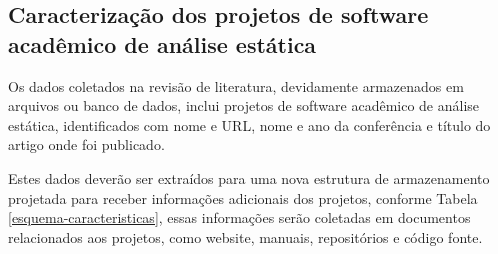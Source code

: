 

\subsection{Caracterização dos projetos de software acadêmico de análise estática}

Os dados coletados na revisão de literatura, devidamente armazenados em
arquivos ou banco de dados, inclui projetos de software acadêmico de análise
estática, identificados com nome e URL, nome e ano da conferência e
título do artigo onde foi publicado.

Estes dados deverão ser extraídos para uma nova estrutura de armazenamento
projetada para receber informações adicionais dos projetos, conforme Tabela
\ref{esquema-caracteristicas}, essas informações serão coletadas em documentos
relacionados aos projetos, como website, manuais, repositórios e código fonte.

